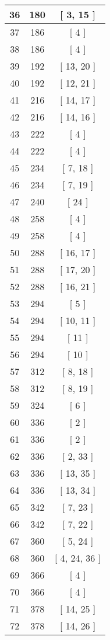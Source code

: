 \begin{center}
\begin{longtable}[H]{|| c c c ||}
36 & 180 & [ 3, 15 ] \\ 
\hline
37 & 186 & [ 4 ] \\ 
\hline
38 & 186 & [ 4 ] \\ 
\hline
39 & 192 & [ 13, 20 ] \\ 
\hline
40 & 192 & [ 12, 21 ] \\ 
\hline
41 & 216 & [ 14, 17 ] \\ 
\hline
42 & 216 & [ 14, 16 ] \\ 
\hline
43 & 222 & [ 4 ] \\ 
\hline
44 & 222 & [ 4 ] \\ 
\hline
45 & 234 & [ 7, 18 ] \\ 
\hline
46 & 234 & [ 7, 19 ] \\ 
\hline
47 & 240 & [ 24 ] \\ 
\hline
48 & 258 & [ 4 ] \\ 
\hline
49 & 258 & [ 4 ] \\ 
\hline
50 & 288 & [ 16, 17 ] \\ 
\hline
51 & 288 & [ 17, 20 ] \\ 
\hline
52 & 288 & [ 16, 21 ] \\ 
\hline
53 & 294 & [ 5 ] \\ 
\hline
54 & 294 & [ 10, 11 ] \\ 
\hline
55 & 294 & [ 11 ] \\ 
\hline
56 & 294 & [ 10 ] \\ 
\hline
57 & 312 & [ 8, 18 ] \\ 
\hline
58 & 312 & [ 8, 19 ] \\ 
\hline
59 & 324 & [ 6 ] \\ 
\hline
60 & 336 & [ 2 ] \\ 
\hline
61 & 336 & [ 2 ] \\ 
\hline
62 & 336 & [ 2, 33 ] \\ 
\hline
63 & 336 & [ 13, 35 ] \\ 
\hline
64 & 336 & [ 13, 34 ] \\ 
\hline
65 & 342 & [ 7, 23 ] \\ 
\hline
66 & 342 & [ 7, 22 ] \\ 
\hline
67 & 360 & [ 5, 24 ] \\ 
\hline
68 & 360 & [ 4, 24, 36 ] \\ 
\hline
69 & 366 & [ 4 ] \\ 
\hline
70 & 366 & [ 4 ] \\ 
\hline
71 & 378 & [ 14, 25 ] \\ 
\hline
72 & 378 & [ 14, 26 ] \\ 

\end{longtable}
\end{center}
